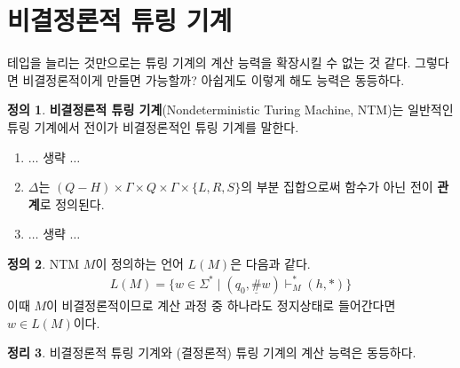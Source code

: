 \documentclass[b5paper, 11pt]{book}
\theoremstyle{definition}
\newtheorem{defn}{정의}[chapter]
\newtheorem{thm}[defn]{정리}
\begin{document}
\section{비결정론적 튜링 기계}
테입을 늘리는 것만으로는 튜링 기계의 계산 능력을 확장시킬 수 없는 것 같다. 그렇다면 비결정론적이게 만들면 가능할까? 아쉽게도 이렇게 해도 능력은 동등하다.
\begin{defn}
\textbf{비결정론적 튜링 기계}(Nondeterministic Turing Machine, NTM)는 일반적인 튜링 기계에서 전이가 비결정론적인 튜링 기계를 말한다. 
\begin{enumerate}
    \item $\ldots$ 생략 $\ldots$ \item $\Delta$는 $(Q-H) \times \Gamma \times Q \times \Gamma \times \{L, R, S\}$의 부분 집합으로써 함수가 아닌 전이 \textbf{관계}로 정의된다. \item $\ldots$ 생략 $\ldots$
\end{enumerate}
\end{defn}
\begin{defn}
    NTM $M$이 정의하는 언어 $L(M)$은 다음과 같다.
    \begin{align*}
        L(M) = \{w \in \Sigma^* \;\vert\; (q_0, \underline{\#}w) \vdash_M^* (h, *)\}
    \end{align*}
    이때 $M$이 비결정론적이므로 계산 과정 중 하나라도 정지상태로 들어간다면 $w \in L(M)$이다. 
\end{defn}
\begin{thm} \label{NTM pf}
    비결정론적 튜링 기계와 (결정론적) 튜링 기계의 계산 능력은 동등하다. 
\end{thm}
\end{document}
